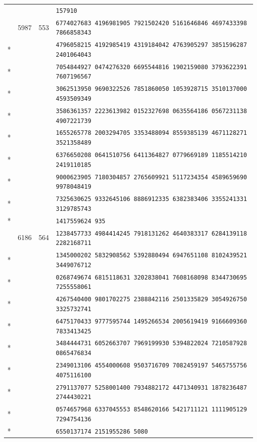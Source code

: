 \documentclass[10pt]{article}
\begin{document}
\begin{longtable}{@{}r@{\quad}r@{\quad}r@{\quad}l@{}}
 & &  & \texttt{157910}\\
\addlinespace[2pt]
100 & 5987 & 553 & \texttt{6774027683 4196981905 7921502420 5161646846 4697433398 7866858343}\\*
 & &  & \texttt{4796058215 4192985419 4319184042 4763905297 3851596287 2401064043}\\*
 & &  & \texttt{7054844927 0474276320 6695544816 1902159080 3793622391 7607196567}\\*
 & &  & \texttt{3062513950 9690322526 7851860050 1053928715 3510137000 4593509349}\\*
 & &  & \texttt{3586361357 2223613982 0152327698 0635564186 0567231138 4907221739}\\*
 & &  & \texttt{1655265778 2003294705 3353488094 8559385139 4671128271 3521358489}\\*
 & &  & \texttt{6376650208 0641510756 6411364827 0779669189 1185514210 2419110185}\\*
 & &  & \texttt{9000623905 7180304857 2765609921 5117234354 4589659690 9978048419}\\*
 & &  & \texttt{7325630625 9332645106 8886912335 6382383406 3355241331 3129785743}\\*
 & &  & \texttt{1417559624 935}\\
\addlinespace[2pt]
101 & 6186 & 564 & \texttt{1238457733 4984414245 7918131262 4640383317 6284139118 2282168711}\\*
 & &  & \texttt{1345000202 5832908562 5392880494 6947651108 8102439521 3449076712}\\*
 & &  & \texttt{0268749674 6815118631 3202838041 7608168098 8344730695 7255558061}\\*
 & &  & \texttt{4267540400 9801702275 2388842116 2501335829 3054926750 3325732741}\\*
 & &  & \texttt{6475170433 9777595744 1495266534 2005619419 9166609360 7833413425}\\*
 & &  & \texttt{3484444731 6052663707 7969199930 5394822024 7210587928 0865476834}\\*
 & &  & \texttt{2349013106 4554000608 9503716709 7082459197 5465755756 4075116100}\\*
 & &  & \texttt{2791137077 5258001400 7934882172 4471340931 1878236487 2744430221}\\*
 & &  & \texttt{0574657968 6337045553 8548620166 5421711121 1111905129 7294754136}\\*
 & &  & \texttt{6550137174 2151955286 5080}\\
\end{longtable}
\endgroup
\end{document}
